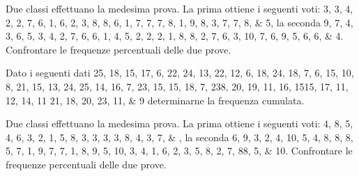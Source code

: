 \begin{esercizio}
 Due classi effettuano la medesima prova. La prima ottiene i seguenti voti: \numlist{3; 3; 4; 2; 2; 7; 6; 1; 6; 2; 3; 8; 8; 6; 1; 7; 7; 7; 8; 1; 9; 8; 3; 7; 7; 8; 5}, la seconda \numlist{9; 7; 4; 3; 6; 5; 3; 4; 2; 7; 6; 6; 1; 4; 5; 2; 2; 2; 1; 8; 8; 2; 7; 6; 3; 10; 7; 6; 9;
	5; 6; 6; 4}. Confrontare le frequenze percentuali delle due prove.
\end{esercizio}
\begin{esercizio}
Dato i seguenti dati \numlist{25; 18; 15; 17; 6; 22; 24; 13; 22; 12; 6; 18; 24; 18; 7; 6; 15; 10; 8; 21; 15; 13;
	24; 25; 14; 16; 7; 23; 15; 15; 18; 7; 23 8; 20; 19; 11; 16; 15 15; 17; 11; 12; 14; 11
	21; 18; 20; 23; 11; 9} determinarne la frequenza cumulata.
\end{esercizio}
\begin{esercizio}
	Due classi effettuano la medesima prova. La prima ottiene i seguenti voti: \numlist{4; 8; 5; 4; 6; 3; 2; 1; 5; 8; 3; 3; 3; 3; 8; 4; 3; 7;}, la seconda \numlist{6; 9; 3; 2; 4; 10; 5; 4; 8; 8; 8; 5; 7; 1; 9; 7; 7; 1; 8; 9; 5; 10; 3; 4; 1; 6; 2; 3; 5;
		8; 2; 7; 8 8; 5; 10}. Confrontare le frequenze percentuali delle due prove.
\end{esercizio} 

